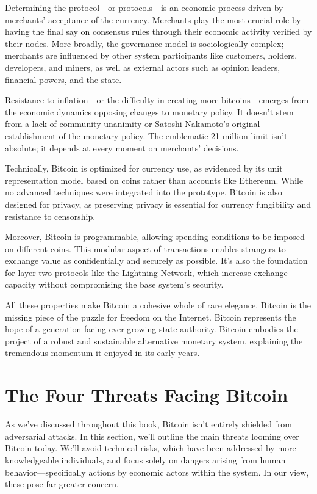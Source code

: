 \documentclass[
  a5paper,
  smalldemyvopaper,10pt,twoside,onecolumn,openright,extrafontsizes,hidelinks]{memoir}
\begin{document}
Determining the protocol---or protocols---is an economic process driven
by merchants' acceptance of the currency. Merchants play the most
crucial role by having the final say on consensus rules through their
economic activity verified by their nodes. More broadly, the governance
model is sociologically complex; merchants are influenced by other
system participants like customers, holders, developers, and miners, as
well as external actors such as opinion leaders, financial powers, and
the state.

Resistance to inflation---or the difficulty in creating more
bitcoins---emerges from the economic dynamics opposing changes to
monetary policy. It doesn't stem from a lack of community unanimity or
Satoshi Nakamoto's original establishment of the monetary policy. The
emblematic 21 million limit isn't absolute; it depends at every moment
on merchants' decisions.

Technically, Bitcoin is optimized for currency use, as evidenced by its
unit representation model based on coins rather than accounts like
Ethereum. While no advanced techniques were integrated into the
prototype, Bitcoin is also designed for privacy, as preserving privacy
is essential for currency fungibility and resistance to censorship.

Moreover, Bitcoin is programmable, allowing spending conditions to be
imposed on different coins. This modular aspect of transactions enables
strangers to exchange value as confidentially and securely as possible.
It's also the foundation for layer-two protocols like the Lightning
Network, which increase exchange capacity without compromising the base
system's security.

All these properties make Bitcoin a cohesive whole of rare elegance.
Bitcoin is the missing piece of the puzzle for freedom on the Internet.
Bitcoin represents the hope of a generation facing ever-growing state
authority. Bitcoin embodies the project of a robust and sustainable
alternative monetary system, explaining the tremendous momentum it
enjoyed in its early years.

\section*{The Four Threats Facing
Bitcoin}\label{the-four-threats-facing-bitcoin}


As we've discussed throughout this book, Bitcoin isn't entirely shielded
from adversarial attacks. In this section, we'll outline the main
threats looming over Bitcoin today. We'll avoid technical risks, which
have been addressed by more knowledgeable individuals, and focus solely
on dangers arising from human behavior---specifically actions by
economic actors within the system. In our view, these pose far greater
concern.
\end{document}
